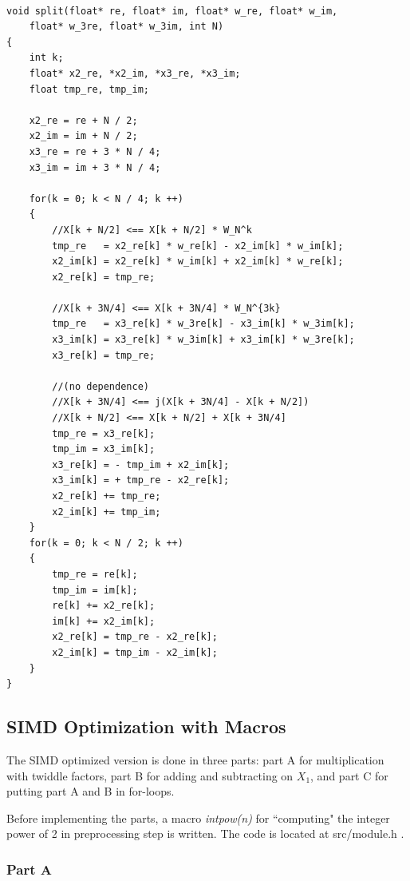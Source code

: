 \documentclass[a4paper]{report}
\begin{document}
    \lstset{language = c, tabsize = 4}
    \begin{lstlisting}

void split(float* re, float* im, float* w_re, float* w_im,
    float* w_3re, float* w_3im, int N)
{
    int k;
    float* x2_re, *x2_im, *x3_re, *x3_im;
    float tmp_re, tmp_im;
    
    x2_re = re + N / 2;
    x2_im = im + N / 2;
    x3_re = re + 3 * N / 4;
    x3_im = im + 3 * N / 4;
    
    for(k = 0; k < N / 4; k ++)
    {
        //X[k + N/2] <== X[k + N/2] * W_N^k
        tmp_re   = x2_re[k] * w_re[k] - x2_im[k] * w_im[k];
        x2_im[k] = x2_re[k] * w_im[k] + x2_im[k] * w_re[k];
        x2_re[k] = tmp_re;
        
        //X[k + 3N/4] <== X[k + 3N/4] * W_N^{3k}
        tmp_re   = x3_re[k] * w_3re[k] - x3_im[k] * w_3im[k];
        x3_im[k] = x3_re[k] * w_3im[k] + x3_im[k] * w_3re[k];
        x3_re[k] = tmp_re;
        
        //(no dependence)
        //X[k + 3N/4] <== j(X[k + 3N/4] - X[k + N/2])
        //X[k + N/2] <== X[k + N/2] + X[k + 3N/4]
        tmp_re = x3_re[k];
        tmp_im = x3_im[k];
        x3_re[k] = - tmp_im + x2_im[k];
        x3_im[k] = + tmp_re - x2_re[k];
        x2_re[k] += tmp_re;
        x2_im[k] += tmp_im;
    }
    for(k = 0; k < N / 2; k ++)
    {
        tmp_re = re[k];
        tmp_im = im[k];
        re[k] += x2_re[k];
        im[k] += x2_im[k];
        x2_re[k] = tmp_re - x2_re[k];
        x2_im[k] = tmp_im - x2_im[k];
    }
}
    \end{lstlisting}

\subsection{SIMD Optimization with Macros} \indent

	The SIMD optimized version is done in three parts: part A for multiplication with twiddle factors, part B for adding and subtracting on $X_1$, and part C for putting part A and B in for-loops.
	
	Before implementing the parts, a macro \textit{intpow(n)} for ``computing" the integer power of 2 in preprocessing step is written. The code is located at src/module.h .
	
\subsubsection{Part A} \indent
\end{document}
